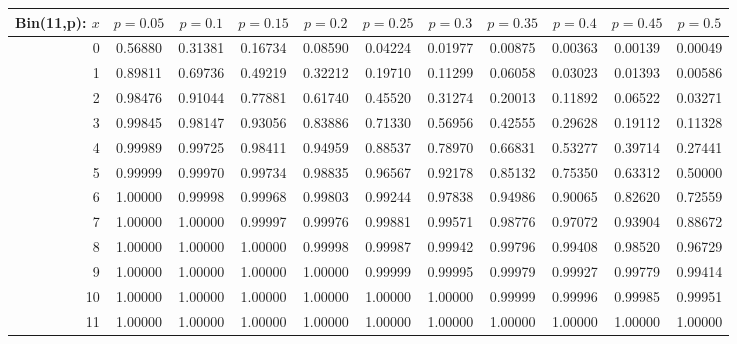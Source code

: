 \documentclass{article}
\begin{document}
{\vspace{8pt minus 6pt}
\begin{tabular}{@{\extracolsep{-2pt}}|r|c|c|c|c|c|c|c|c|c|c|}
\hline
Bin(11,p): $x$
   & $p\!=\!0.05$& $p\!=\!0.1$& $p\!=\!0.15$& $p\!=\!0.2$& $p\!=\!0.25$& $p\!=\!0.3$& $p\!=\!0.35$& $p\!=\!0.4$& $p\!=\!0.45$& $p\!=\!0.5$\\\hline
  0&0.56880&0.31381&0.16734&0.08590&0.04224&0.01977&0.00875&0.00363&0.00139&0.00049\\
  1&0.89811&0.69736&0.49219&0.32212&0.19710&0.11299&0.06058&0.03023&0.01393&0.00586\\
  2&0.98476&0.91044&0.77881&0.61740&0.45520&0.31274&0.20013&0.11892&0.06522&0.03271\\
  3&0.99845&0.98147&0.93056&0.83886&0.71330&0.56956&0.42555&0.29628&0.19112&0.11328\\
  4&0.99989&0.99725&0.98411&0.94959&0.88537&0.78970&0.66831&0.53277&0.39714&0.27441\\
  5&0.99999&0.99970&0.99734&0.98835&0.96567&0.92178&0.85132&0.75350&0.63312&0.50000\\
  6&1.00000&0.99998&0.99968&0.99803&0.99244&0.97838&0.94986&0.90065&0.82620&0.72559\\
  7&1.00000&1.00000&0.99997&0.99976&0.99881&0.99571&0.98776&0.97072&0.93904&0.88672\\
  8&1.00000&1.00000&1.00000&0.99998&0.99987&0.99942&0.99796&0.99408&0.98520&0.96729\\
  9&1.00000&1.00000&1.00000&1.00000&0.99999&0.99995&0.99979&0.99927&0.99779&0.99414\\
 10&1.00000&1.00000&1.00000&1.00000&1.00000&1.00000&0.99999&0.99996&0.99985&0.99951\\
 11&1.00000&1.00000&1.00000&1.00000&1.00000&1.00000&1.00000&1.00000&1.00000&1.00000\\
\hline
\end{tabular}

}
\end{document}
